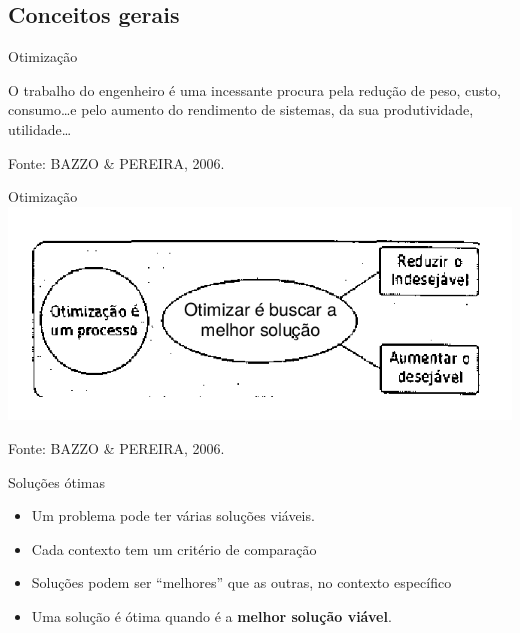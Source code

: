 \documentclass{beamer}
\begin{document}
\subsection{Conceitos gerais}

\begin{frame}{Otimização}
  \begin{definition}
    O trabalho do engenheiro é uma incessante procura pela redução de
    peso, custo, consumo\ldots e pelo aumento do rendimento de sistemas,
    da sua produtividade, utilidade\ldots
  \end{definition}

\vfill
Fonte: BAZZO \& PEREIRA, 2006.
\end{frame}

\begin{frame}{Otimização}
  \centering
  \includegraphics[width=.9\textwidth]{otimizacao/otimizacao}

\vfill
Fonte: BAZZO \& PEREIRA, 2006.
\end{frame}

\begin{frame}{Soluções ótimas}
  \begin{itemize}
  \item Um problema pode ter várias soluções \alert{viáveis}.
  \item Cada contexto tem um critério de comparação
  \item Soluções podem ser ``melhores'' que as outras, no contexto específico
  \item Uma solução é \alert{ótima} quando é a {\bf melhor solução viável}.
  \end{itemize}
\end{frame}
\end{document}
